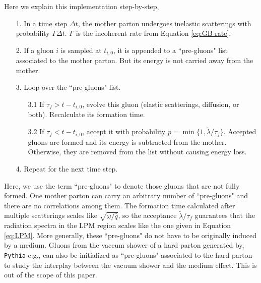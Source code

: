 \documentclass[aps, prc, reprint, amsmath, groupedaddress, nofootinbib]{revtex4-1}
\begin{document}
Here we explain this implementation step-by-step,
\begin{itemize}
\item[1.] In a time step $\Delta t$, the mother parton undergoes inelastic scatterings with probability $\Gamma\Delta t$. $\Gamma$ is the incoherent rate from Equation \ref{eq:GB-rate}.
\item[2.] If a gluon $i$ is sampled at $t_{i,0}$, it is appended to a ``pre-gluons" list associated to the mother parton. But its energy is not carried away from the mother.
\item[3.] Loop over the ``pre-gluons" list. 
\begin{itemize}
\item[3.1] If $\tau_f > t-t_{i,0}$, evolve this gluon (elastic scatterings, diffusion, or both). Recalculate its formation time.
\item[3.2] If $\tau_f < t-t_{i,0}$, accept it with probability $p = \min\{1, \tilde{\lambda}/\tau_f\}$. Accepted gluons are formed and its energy is subtracted from the mother. Otherwise, they are removed from the list without causing energy loss.
\end{itemize} 
\item[4.] Repeat for the next time step.
\end{itemize}
Here, we use the term ``pre-gluons" to denote those gluons that are not fully formed.
One mother parton can carry an arbitrary number of ``pre-gluons" and there are no correlations among them.
The formation time calculated after multiple scatterings scales like $\sqrt{\omega/\hat{q}}$, so the acceptance $\tilde{\lambda}/\tau_f$ guarantees that the radiation spectra in the LPM region scales like the one given in Equation \ref{eq:LPM}.
More generally, these ``pre-gluons" do not have to be originally induced by a medium. 
Gluons from the vaccum shower of a hard parton generated by, {\tt Pythia} e.g., can also be initialized as ``pre-gluons" associated to the hard parton to study the interplay between the vacuum shower and the medium effect.
This is out of the scope of this paper.
\end{document}
